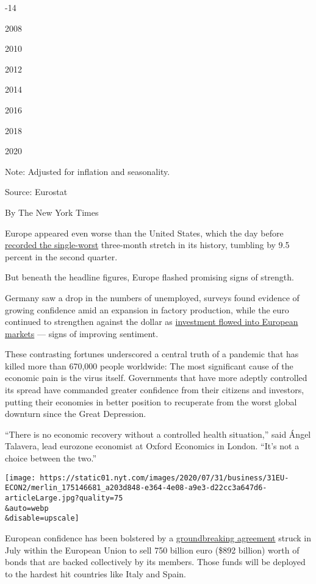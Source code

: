 -14

2008

2010

2012

2014

2016

2018

2020

Note: Adjusted for inflation and seasonality.

Source: Eurostat

By The New York Times

Europe appeared even worse than the United States, which the day before
\href{https://www.nytimes.com/2020/07/30/business/economy/q2-gdp-coronavirus-economy.html?action=click\&module=Top\%20Stories\&pgtype=Homepage}{recorded
the single-worst} three-month stretch in its history, tumbling by 9.5
percent in the second quarter.

But beneath the headline figures, Europe flashed promising signs of
strength.

Germany saw a drop in the numbers of unemployed, surveys found evidence
of growing confidence amid an expansion in factory production, while the
euro continued to strengthen against the dollar as
\href{https://www.nytimes.com/2020/07/30/business/europes-markets-are-having-a-moment.html}{investment
flowed into European markets} --- signs of improving sentiment.

These contrasting fortunes underscored a central truth of a pandemic
that has killed more than 670,000 people worldwide: The most significant
cause of the economic pain is the virus itself. Governments that have
more adeptly controlled its spread have commanded greater confidence
from their citizens and investors, putting their economies in better
position to recuperate from the worst global downturn since the Great
Depression.

``There is no economic recovery without a controlled health situation,''
said Ángel Talavera, lead eurozone economist at Oxford Economics in
London. ``It's not a choice between the two.''

\texttt{[image: https://static01.nyt.com/images/2020/07/31/business/31EU-ECON2/merlin\_175146681\_a203d848-e364-4e08-a9e3-d22cc3a647d6-articleLarge.jpg?quality=75\\\&auto=webp\\\&disable=upscale]}

European confidence has been bolstered by a
\href{https://www.nytimes.com/2020/07/20/world/europe/eu-stimulus-coronavirus.html}{groundbreaking
agreement} struck in July within the European Union to sell 750 billion
euro (\$892 billion) worth of bonds that are backed collectively by its
members. Those funds will be deployed to the hardest hit countries like
Italy and Spain.

